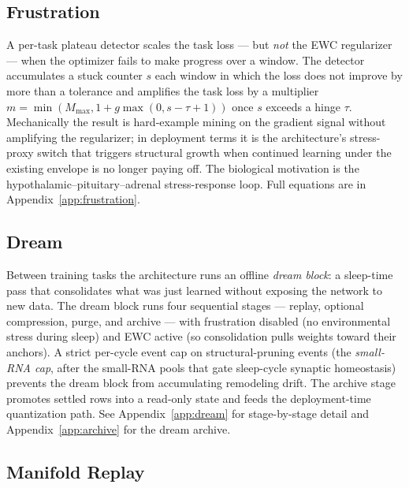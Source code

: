 \documentclass[11pt]{article}
\begin{document}
\subsection{Frustration}
\label{sec:methods-frustration}

A per-task plateau detector scales the task loss --- but \emph{not}
the EWC regularizer --- when the optimizer fails to make progress
over a window. The detector accumulates a stuck counter $s$ each
window in which the loss does not improve by more than a tolerance
and amplifies the task loss by a multiplier
$m = \min(M_{\max}, 1 + g \max(0, s - \tau + 1))$ once $s$ exceeds a
hinge $\tau$. Mechanically the result is hard-example mining on the
gradient signal without amplifying the regularizer; in deployment
terms it is the architecture's stress-proxy switch that triggers
structural growth when continued learning under the existing envelope
is no longer paying off. The biological motivation is the
hypothalamic--pituitary--adrenal stress-response loop. Full equations
are in Appendix~\ref{app:frustration}.

\subsection{Dream}
\label{sec:methods-dream}

Between training tasks the architecture runs an offline \emph{dream
block}: a sleep-time pass that consolidates what was just learned
without exposing the network to new data. The dream block runs four
sequential stages --- replay, optional compression, purge, and
archive --- with frustration disabled (no environmental stress during
sleep) and EWC active (so consolidation pulls weights toward their
anchors). A strict per-cycle event cap on structural-pruning events
(the \emph{small-RNA cap}, after the small-RNA pools that gate
sleep-cycle synaptic homeostasis) prevents the dream block from
accumulating remodeling drift. The archive stage promotes settled
rows into a read-only state and feeds the deployment-time
quantization path. See Appendix~\ref{app:dream} for stage-by-stage
detail and Appendix~\ref{app:archive} for the dream archive.

\subsection{Manifold Replay}
\label{sec:methods-manifold}
\end{document}
